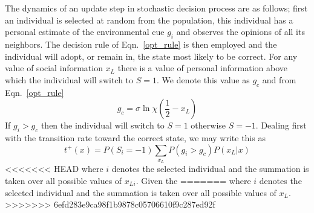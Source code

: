 \documentclass[aps,prl,twocolumn,showpacs,superscriptaddress,groupedaddress]{revtex4}
\begin{document}
The dynamics of an update step in stochastic decision process are as follows; first an individual is selected at random from the population, this individual has a personal estimate of the environmental cue $g_i$ and observes the opinions of all its neighbors. The decision rule of Eqn.~\ref{opt_rule} is then employed and the individual will adopt, or remain in, the state most likely to be correct.
For any value of social information $x_L$ there is a value of personal information above which the individual will switch to $S=1$. We denote this value as $g_c$ and from Eqn.~\ref{opt_rule} 
\begin{equation}
g_c  = \sigma\ln\chi  \left(\frac{1}{2}-x_L\right) 
\end{equation}
If $g_i>g_c$ then the individual will switch to $S=1$ otherwise $S=-1$. 
Dealing first with the transition rate toward the correct state, we may write this as
\begin{equation}
t^+(x) = P(S_i=-1)\sum_{x_{L}}P\left(g_i>g_c \right)P\left(x_{L}|x\right)
\label{up}
\end{equation}
<<<<<<< HEAD
where $i$ denotes the selected individual and the summation is taken over all possible values of $x_{Li}$.
Given the 
=======
where $i$ denotes the selected individual and the summation is taken over all possible values of $x_{L}$. 
>>>>>>> 6efd283e9ca98f1b9878c05706610f9c287ed92f
\end{document}
